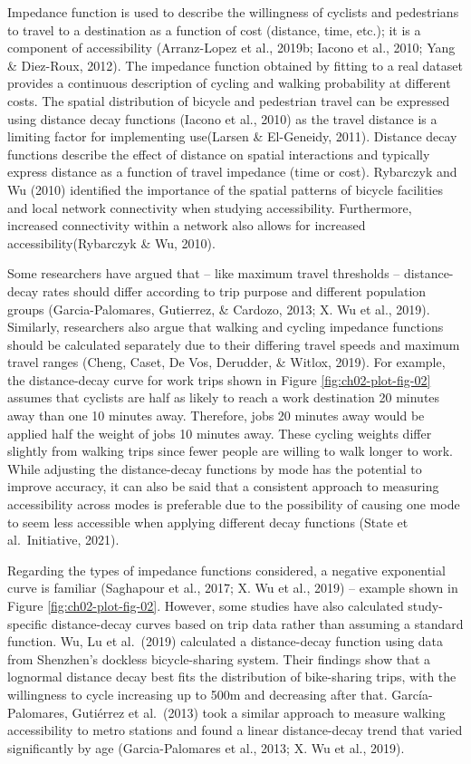 \documentclass[
11pt, %
oneside, %
english, %
singlespacing, %
]{macthesis} %
\begin{document}
Impedance function is used to describe the willingness of cyclists and pedestrians to travel to a destination as a function of cost (distance, time, etc.); it is a component of accessibility (Arranz-Lopez et al., 2019b; Iacono et al., 2010; Yang \& Diez-Roux, 2012). The impedance function obtained by fitting to a real dataset provides a continuous description of cycling and walking probability at different costs. The spatial distribution of bicycle and pedestrian travel can be expressed using distance decay functions (Iacono et al., 2010) as the travel distance is a limiting factor for implementing use(Larsen \& El-Geneidy, 2011). Distance decay functions describe the effect of distance on spatial interactions and typically express distance as a function of travel impedance (time or cost). Rybarczyk and Wu (2010) identified the importance of the spatial patterns of bicycle facilities and local network connectivity when studying accessibility. Furthermore, increased connectivity within a network also allows for increased accessibility(Rybarczyk \& Wu, 2010).

Some researchers have argued that -- like maximum travel thresholds -- distance-decay rates should differ according to trip purpose and different population groups (Garcia-Palomares, Gutierrez, \& Cardozo, 2013; X. Wu et al., 2019). Similarly, researchers also argue that walking and cycling impedance functions should be calculated separately due to their differing travel speeds and maximum travel ranges (Cheng, Caset, De Vos, Derudder, \& Witlox, 2019). For example, the distance-decay curve for work trips shown in Figure \ref{fig:ch02-plot-fig-02} assumes that cyclists are half as likely to reach a work destination 20 minutes away than one 10 minutes away. Therefore, jobs 20 minutes away would be applied half the weight of jobs 10 minutes away. These cycling weights differ slightly from walking trips since fewer people are willing to walk longer to work. While adjusting the distance-decay functions by mode has the potential to improve accuracy, it can also be said that a consistent approach to measuring accessibility across modes is preferable due to the possibility of causing one mode to seem less accessible when applying different decay functions (State et al.~Initiative, 2021).

Regarding the types of impedance functions considered, a negative exponential curve is familiar (Saghapour et al., 2017; X. Wu et al., 2019) -- example shown in Figure \ref{fig:ch02-plot-fig-02}. However, some studies have also calculated study-specific distance-decay curves based on trip data rather than assuming a standard function. Wu, Lu et al.~(2019) calculated a distance-decay function using data from Shenzhen's dockless bicycle-sharing system. Their findings show that a lognormal distance decay best fits the distribution of bike-sharing trips, with the willingness to cycle increasing up to 500m and decreasing after that. García-Palomares, Gutiérrez et al.~(2013) took a similar approach to measure walking accessibility to metro stations and found a linear distance-decay trend that varied significantly by age (Garcia-Palomares et al., 2013; X. Wu et al., 2019).
\end{document}
